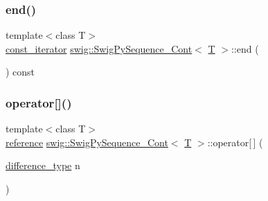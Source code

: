 \subsubsection{\texorpdfstring{end()}{end()}\hspace{0.1cm}{\footnotesize\ttfamily [2/2]}}
{\footnotesize\ttfamily template$<$class T$>$ \\
\hyperlink{structswig_1_1_swig_py_sequence___cont_a708a6b3790b68aa53bd79d27a2c16b89}{const\+\_\+iterator} \hyperlink{structswig_1_1_swig_py_sequence___cont}{swig\+::\+Swig\+Py\+Sequence\+\_\+\+Cont}$<$ \hyperlink{fmt_8h_a0acb682b8260ab1c60b918599864e2e5}{T} $>$\+::end (\begin{DoxyParamCaption}{ }\end{DoxyParamCaption}) const\hspace{0.3cm}{\ttfamily [inline]}}

\mbox{\label{structswig_1_1_swig_py_sequence___cont_a796a0c43a8a8af5a42f52994b6651960}} 
\subsubsection{\texorpdfstring{operator[]()}{operator[]()}\hspace{0.1cm}{\footnotesize\ttfamily [1/2]}}
{\footnotesize\ttfamily template$<$class T$>$ \\
\hyperlink{structswig_1_1_swig_py_sequence___cont_a4108668900abc99b72844a3a880b3638}{reference} \hyperlink{structswig_1_1_swig_py_sequence___cont}{swig\+::\+Swig\+Py\+Sequence\+\_\+\+Cont}$<$ \hyperlink{fmt_8h_a0acb682b8260ab1c60b918599864e2e5}{T} $>$\+::operator\mbox{[}$\,$\mbox{]} (\begin{DoxyParamCaption}\item[{\hyperlink{structswig_1_1_swig_py_sequence___cont_a016875541fce2f04f396da8057a190f9}{difference\+\_\+type}}]{n }\end{DoxyParamCaption})\hspace{0.3cm}{\ttfamily [inline]}}

\mbox{\label{structswig_1_1_swig_py_sequence___cont_a33b8b37c909c48bc894cd9b909d1e81d}} 
